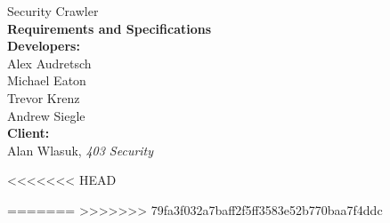 \documentclass{article}
\begin{document}
\begin{titlepage}
    \begin{center}
        {\huge Security Crawler}\\
        \vspace{2cm}
        {\bf{\LARGE Requirements and Specifications}}\\
        \vspace{9cm}
        {\Large \textbf{Developers:}\\ Alex Audretsch\\Michael Eaton\\Trevor Krenz\\Andrew Siegle}\\
        \vspace{2cm}
        {\Large \textbf{Client:} \\ Alan Wlasuk, \emph{403 Security}}
        
    \end{center}
\end{titlepage}
\tableofcontents
\newpage

\setcounter{page}{1}

\newpage

\newpage

\newpage

<<<<<<< HEAD

=======
\newpage
>>>>>>> 79fa3f032a7baff2f5ff3583e52b770baa7f4ddc

\newpage


\newpage

\newpage

\newpage

\newpage

\newpage

\end{document}
